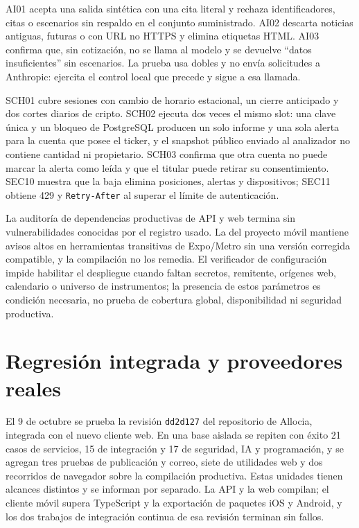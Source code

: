 AI01 acepta una salida sintética con una cita literal y rechaza identificadores, citas o escenarios sin respaldo en el conjunto suministrado. AI02 descarta noticias antiguas, futuras o con URL no HTTPS y elimina etiquetas HTML. AI03 confirma que, sin cotización, no se llama al modelo y se devuelve \enquote{datos insuficientes} sin escenarios. La prueba usa dobles y no envía solicitudes a Anthropic: ejercita el control local que precede y sigue a esa llamada.

SCH01 cubre sesiones con cambio de horario estacional, un cierre anticipado y dos cortes diarios de cripto. SCH02 ejecuta dos veces el mismo slot: una clave única y un bloqueo de PostgreSQL producen un solo informe y una sola alerta para la cuenta que posee el ticker, y el snapshot público enviado al analizador no contiene cantidad ni propietario. SCH03 confirma que otra cuenta no puede marcar la alerta como leída y que el titular puede retirar su consentimiento. SEC10 muestra que la baja elimina posiciones, alertas y dispositivos; SEC11 obtiene 429 y \texttt{Retry-After} al superar el límite de autenticación.

La auditoría de dependencias productivas de API y web termina sin vulnerabilidades conocidas por el registro usado. La del proyecto móvil mantiene avisos altos en herramientas transitivas de Expo/Metro sin una versión corregida compatible, y la compilación no los remedia. El verificador de configuración impide habilitar el despliegue cuando faltan secretos, remitente, orígenes web, calendario o universo de instrumentos; la presencia de estos parámetros es condición necesaria, no prueba de cobertura global, disponibilidad ni seguridad productiva.

\section{Regresión integrada y proveedores reales}\label{sec:regresion-integrada}

El 9 de octubre se prueba la revisión \texttt{dd2d127} del repositorio de Allocia, integrada con el nuevo cliente web. En una base aislada se repiten con éxito 21 casos de servicios, 15 de integración y 17 de seguridad, IA y programación, y se agregan tres pruebas de publicación y correo, siete de utilidades web y dos recorridos de navegador sobre la compilación productiva. Estas unidades tienen alcances distintos y se informan por separado. La API y la web compilan; el cliente móvil supera TypeScript y la exportación de paquetes iOS y Android, y los dos trabajos de integración continua de esa revisión terminan sin fallos.

